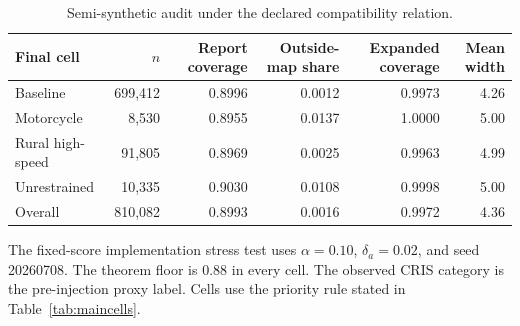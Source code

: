 \begin{table}[pos=htbp]
\caption{Semi-synthetic audit under the declared compatibility relation.}
\label{tab:semisynthetic}
\centering\footnotesize
\begin{threeparttable}
\begin{tabular}{lrrrrr}
\toprule
Final cell & $n$ & Report coverage & Outside-map share & Expanded coverage & Mean width \\
\midrule
Baseline & 699,412 & 0.8996 & 0.0012 & 0.9973 & 4.26 \\
Motorcycle & 8,530 & 0.8955 & 0.0137 & 1.0000 & 5.00 \\
Rural high-speed & 91,805 & 0.8969 & 0.0025 & 0.9963 & 4.99 \\
Unrestrained & 10,335 & 0.9030 & 0.0108 & 0.9998 & 5.00 \\
Overall & 810,082 & 0.8993 & 0.0016 & 0.9972 & 4.36 \\
\bottomrule
\end{tabular}
\begin{tablenotes}\footnotesize
\item The fixed-score implementation stress test uses $\alpha=0.10$, $\delta_a=0.02$, and seed 20260708. The theorem floor is 0.88 in every cell. The observed CRIS category is the pre-injection proxy label. Cells use the priority rule stated in Table~\ref{tab:maincells}.
\end{tablenotes}
\end{threeparttable}
\end{table}
